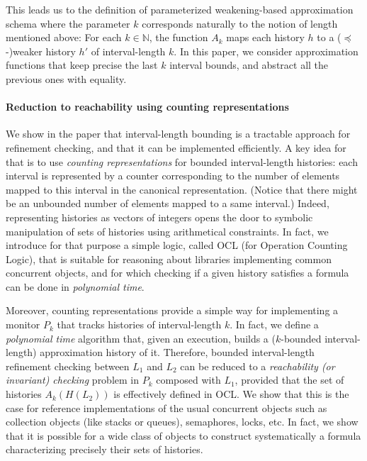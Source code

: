 This leads us to the definition of parameterized weakening-based approximation
schema where the parameter $k$ corresponds naturally to the notion of length
mentioned above: For each $k \in \mathbb{N}$, the function $A_k$ maps each
history $h$ to a ($\preceq$-)weaker history $h'$ of interval-length $k$. In
this paper, we consider approximation functions that keep precise the last $k$
interval bounds, and abstract all the previous ones with equality.

\paragraph{Reduction to reachability using counting representations}

We show in the paper that interval-length bounding is a tractable approach for
refinement checking, and that it can be implemented efficiently. A key idea for
that is to use \emph{counting representations} for bounded interval-length
histories: each interval is represented by a counter corresponding to the
number of elements mapped to this interval in the canonical representation.
(Notice that there might be an unbounded number of elements mapped to a same
interval.) Indeed, representing histories as vectors of integers opens the door
to symbolic manipulation of sets of histories using arithmetical constraints.
In fact, we introduce for that purpose a simple logic, called OCL (for
Operation Counting Logic), that is suitable for reasoning about libraries
implementing common concurrent objects, and for which checking if a given
history satisfies a formula can be done in \emph{polynomial time}.

Moreover, counting representations provide a simple way for implementing a
monitor $P_k$ that tracks histories of interval-length $k$. In fact, we define
a \emph{polynomial time} algorithm that, given an execution, builds a
($k$-bounded interval-length) approximation history of it. Therefore, bounded
interval-length refinement checking between $L_1$ and $L_2$ can be reduced to a
\emph{reachability (or invariant) checking} problem in $P_k$ composed with
$L_1$, provided that the set of histories $A_k(H(L_2))$ is effectively defined
in OCL. We show that this is the case for reference implementations of the
usual concurrent objects such as collection objects (like stacks or queues),
semaphores, locks, etc. In fact, we show that it is possible for a wide class
of objects to construct systematically a formula characterizing precisely their
sets of histories.

